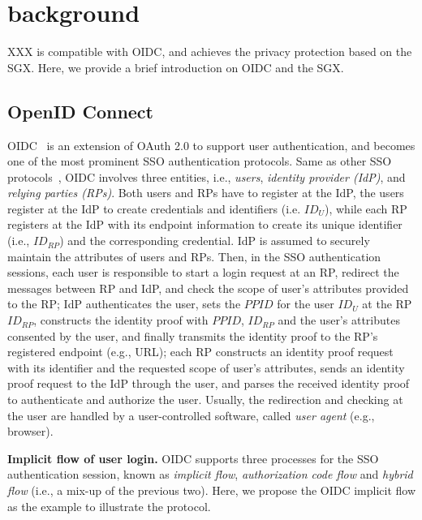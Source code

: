 \section{background}
XXX is compatible with OIDC, and achieves the privacy protection based on the SGX.
Here, we provide a brief introduction on OIDC and the SGX.
\subsection{OpenID Connect}
OIDC~\cite{OpenIDConnect} is an extension of OAuth 2.0 to support user authentication,
 and becomes one of the most prominent SSO authentication protocols.
Same as other SSO protocols~\cite{SAMLIdentifier}, OIDC involves three entities, i.e., {\em users}, {\em identity provider (IdP)}, and {\em relying parties (RPs)}.
Both users and RPs have to register at the IdP,    
the users register at the IdP to create credentials and identifiers (i.e. $ID_U$), 
while each RP registers at the IdP with its endpoint information to create its unique identifier (i.e., $ID_{RP}$) and the corresponding credential.
IdP is assumed to securely maintain the attributes  of users and RPs.   
Then, in the SSO authentication sessions, 
 each user is responsible to start a login request at an RP, redirect the messages between RP and IdP, and check the scope of user's attributes provided to the RP;
 IdP authenticates the user, sets the $PPID$ for the user $ID_U$ at the RP $ID_{RP}$,
 constructs the identity proof with  $PPID$, $ID_{RP}$ and the user's attributes consented by the user, and finally transmits the identity proof to the RP's registered endpoint (e.g., URL);
 each RP constructs an identity proof request with its identifier and the requested scope of  user's attributes, sends an identity proof request to the IdP through the user, and parses the received identity proof to authenticate and authorize the user.
Usually, the redirection and checking at the user are handled by a user-controlled software, called {\em user agent} (e.g., browser).

\noindent\textbf{Implicit flow of user login.}
OIDC supports three processes for the SSO authentication session, known as {\em implicit flow}, {\em authorization code flow} and {\em hybrid flow} (i.e., a mix-up of the previous two). Here, we propose the OIDC implicit flow as the example to illustrate the protocol. 

